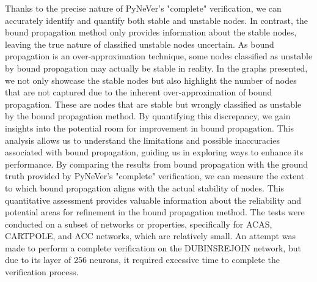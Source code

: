 Thanks to the precise nature of PyNeVer's "complete" verification, we can accurately identify and quantify both stable and unstable nodes. In contrast, the bound propagation method only provides information about the stable nodes, leaving the true nature of classified unstable nodes uncertain. 
As bound propagation is an over-approximation technique, some nodes classified as unstable by bound propagation may actually be stable in reality.
In the graphs presented, we not only showcase the stable nodes but also highlight the number of nodes that are not captured due to the inherent over-approximation of bound propagation. These are nodes 
that are stable but wrongly classified as unstable by the bound propagation method. By quantifying this discrepancy, we gain insights into the potential room for improvement in bound propagation.
This analysis allows us to understand the limitations and possible inaccuracies associated with bound propagation, guiding us in exploring ways to enhance its performance. 
By comparing the results from bound propagation with the ground truth provided by PyNeVer's "complete" verification, we can measure the extent to which bound propagation aligns with the actual stability of nodes. 
This quantitative assessment provides valuable information about the reliability and potential areas for refinement in the bound propagation method.
The tests were conducted on a subset of networks or properties, specifically for ACAS, CARTPOLE, and ACC networks, which are relatively small. An attempt was made to perform a complete verification on the DUBINSREJOIN network, but due to its layer of 256 neurons, it required excessive time to complete the verification process.

